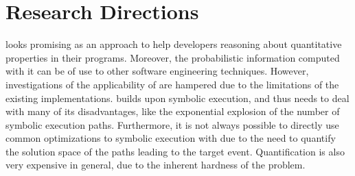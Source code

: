 \documentclass[10pt]{article}
\newcounter{list}
\begin{document}

\section{Research Directions}
\label{research}

\PSE{} looks promising as an approach to help developers reasoning
about quantitative properties in their programs. Moreover, the
probabilistic information computed with it can be of use to other
software engineering techniques. However, investigations of the
applicability of \PSE{} are hampered due to the limitations of the
existing implementations. \PSE{} builds upon symbolic execution, and
thus needs to deal with many of its disadvantages, like the
exponential explosion of the number of symbolic execution
paths. Furthermore, it is not always possible to directly use
common optimizations to symbolic execution with \PSE{} due to the need to
quantify the solution space of the paths leading to the target
event. Quantification is also very expensive in general, due to the
inherent hardness of the problem.



\end{document}
